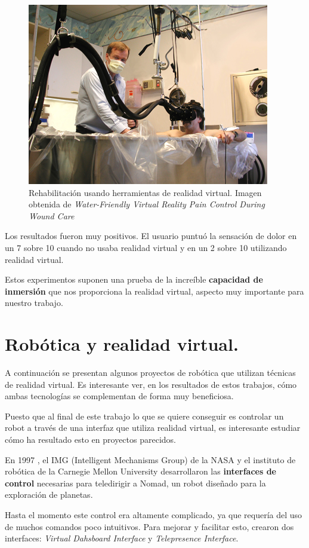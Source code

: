 \documentclass[twoside, 11pt]{epstfg}
\begin{document}
\begin{figure}[h]
	\centerline{
		\mbox{\includegraphics[width=.50\textwidth]{images/waterfriendly.png}}
	}
	\caption{Rehabilitación usando herramientas de realidad virtual. Imagen obtenida de \textit{Water-Friendly Virtual Reality Pain Control During Wound Care} \cite{JCLP:JCLP10244}}
	
\end{figure}

Los resultados fueron muy positivos. El usuario puntuó la sensación de dolor en un 7 sobre 10 cuando no usaba realidad virtual y en un 2 sobre 10 utilizando realidad virtual.\cite{JCLP:JCLP10244}

Estos experimentos suponen una prueba de la increíble \textbf{capacidad de inmersión} que nos proporciona la realidad virtual, aspecto muy importante para nuestro trabajo.


\section{Robótica y realidad virtual.} 
\label{sec:robotica y VR}

A continuación se presentan algunos proyectos de robótica que utilizan técnicas de realidad virtual. Es interesante ver, en los resultados de estos trabajos, cómo ambas tecnologías se complementan de forma muy beneficiosa.

Puesto que al final de este trabajo lo que se quiere conseguir es controlar un robot a través de una interfaz que utiliza realidad virtual, es interesante estudiar cómo ha resultado esto en proyectos parecidos.

En 1997 , el IMG (Intelligent Mechanisms Group) de la NASA y el instituto de robótica de la Carnegie Mellon University desarrollaron las \textbf{interfaces de control} necesarias para teledirigir a Nomad, un robot diseñado para la exploración de planetas. \cite{Nguyen2001}

Hasta el momento este control era altamente complicado, ya que requería del uso de muchos comandos poco intuitivos. Para mejorar y facilitar esto, crearon dos interfaces:\textit{ Virtual Dahsboard Interface} y \textit{Telepresence Interface}.
\end{document}

